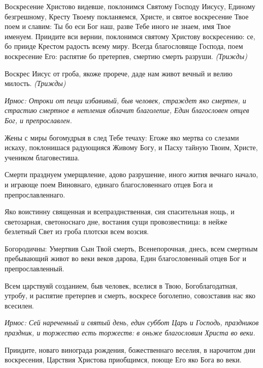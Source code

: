 Воскресение Христово видевше, поклонимся Святому Господу Иисусу, Единому безгрешному, Кресту Твоему покланяемся, Христе, и святое воскресение Твое поем и славим: Ты бо еси Бог наш, разве Тебе иного не знаем, имя Твое именуем. Приидите вси вернии, поклонимся святому Христову воскресению: се, бо прииде Крестом радость всему миру. Всегда благословяще Господа, поем воскресение Его: распятие бо претерпев, смертию смерть разруши. \itshape (Трижд\normalfont{}ы) 



Воскрес Иисус от гроба, якоже прорече, даде нам живот вечный и велию милость. \itshape (Трижд\normalfont{}ы) 


\itshape Ирмос\normalfont{}: Отроки от пещи избавивый, быв человек, страждет яко смертен, и страстию смертное в нетления облачит благолепие, Един благословен отцев Бог, и препрославлен. 



Жены с миры богомудрыя в след Тебе течаху: Егоже яко мертва со слезами искаху, поклонишася радующияся Живому Богу, и Пасху тайную Твоим, Христе, учеником благовестиша. 



Смерти празднуем умерщвление, адово разрушение, иного жития вечнаго начало, и играюще поем Виновнаго, единаго благословеннаго отцев Бога и препрославленнаго. 



Яко воистинну священная и всепразднственная, сия спасительная нощь, и светозарная, светоноснаго дне, востания сущи провозвестница: в нейже безлетный Свет из гроба плотски всем возсия. \itshape 

Богородичны\normalfont{}: Умертвив Сын Твой смерть, Всенепорочная, днесь, всем смертным пребывающий живот во веки веков дарова, Един благословенный отцев Бог и препрославленный. 



Всем царствуяй созданием, быв человек, вселися в Твою, Богоблагодатная, утробу, и распятие претерпев и смерть, воскресе боголепно, совозставив нас яко всесилен. 


\itshape Ирмос\normalfont{}: Сей нареченный и святый день, един суббот Царь и Господь, праздников праздник, и торжество есть торжеств: в оньже благословим Христа во веки. 



Приидите, новаго винограда рождения, божественнаго веселия, в нарочитом дни воскресения, Царствия Христова приобщимся, поюще Его яко Бога во веки. 



